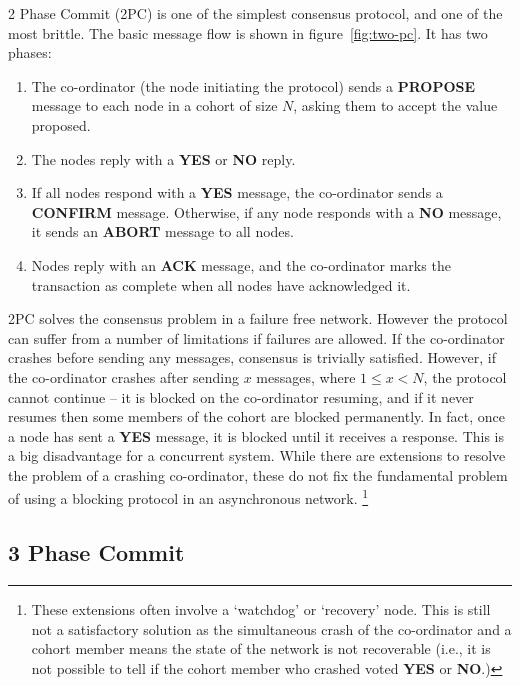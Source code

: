 \documentclass[12pt,twoside,notitlepage]{report}
\newcommand{\msg}[1] {{\bf #1}}         %
\begin{document}
2 Phase Commit (2PC) is one of the simplest consensus protocol, and one of the most brittle. The
basic message flow is shown in figure~\ref{fig:two-pc}. It has two phases:

\begin{enumerate}
\item The co-ordinator (the node initiating the protocol) sends a \msg{PROPOSE} message to each
	node in a cohort of size $N$, asking them to accept the value proposed.
\item The nodes reply with a \msg{YES} or \msg{NO} reply.
\item If all nodes respond with a \msg{YES} message, the co-ordinator sends a \msg{CONFIRM} message. Otherwise, if
	any node responds with a \msg{NO} message, it sends an \msg{ABORT} message to all nodes.
\item Nodes reply with an \msg{ACK} message, and the co-ordinator marks the transaction as
	complete when all nodes have acknowledged it.
\end{enumerate}


2PC solves the consensus problem in a failure free network. However the protocol can suffer from a
number of limitations if failures are allowed. If the co-ordinator crashes before sending
any messages, consensus is trivially satisfied. However, if the co-ordinator crashes after sending
$x$ messages, where $1 \le x < N$, the protocol cannot continue -- it is blocked on the
co-ordinator resuming, and if it never resumes then some members of the cohort are blocked
permanently. In fact, once a node has sent a \msg{YES} message, it is blocked until it receives a
response. This is a big disadvantage for a concurrent system. While there are extensions to
resolve the problem of a crashing co-ordinator, these do not fix the fundamental problem of using
a blocking protocol in an asynchronous network. \footnote{These extensions often involve a `watchdog' or
`recovery' node. This is still not a satisfactory solution as the simultaneous crash of the
co-ordinator and a cohort member means the state of the network is not recoverable (i.e., it is
not possible to tell if the cohort member who crashed voted \msg{YES} or \msg{NO}.)}

\subsection*{3 Phase Commit}
\end{document}
